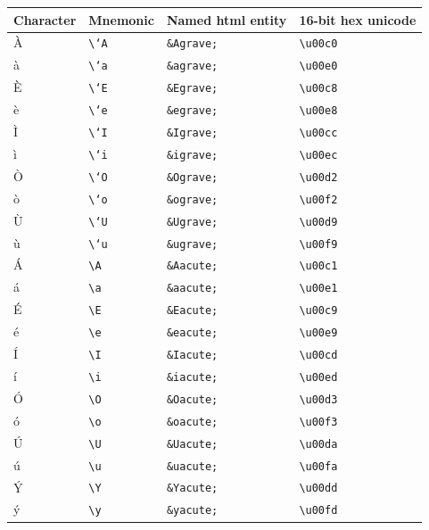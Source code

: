 \documentclass[oneside]{book}
\begin{document}
\begin{longtable}[]{@{}llll@{}}
\toprule
Character & Mnemonic & Named html entity & 16-bit hex
unicode\tabularnewline
\midrule
\endhead
À & \texttt{\textbackslash{}`A} & \texttt{\&Agrave;} &
\texttt{\textbackslash{}u00c0}\tabularnewline
à & \texttt{\textbackslash{}`a} & \texttt{\&agrave;} &
\texttt{\textbackslash{}u00e0}\tabularnewline
È & \texttt{\textbackslash{}`E} & \texttt{\&Egrave;} &
\texttt{\textbackslash{}u00c8}\tabularnewline
è & \texttt{\textbackslash{}`e} & \texttt{\&egrave;} &
\texttt{\textbackslash{}u00e8}\tabularnewline
Ì & \texttt{\textbackslash{}`I} & \texttt{\&Igrave;} &
\texttt{\textbackslash{}u00cc}\tabularnewline
ì & \texttt{\textbackslash{}`i} & \texttt{\&igrave;} &
\texttt{\textbackslash{}u00ec}\tabularnewline
Ò & \texttt{\textbackslash{}`O} & \texttt{\&Ograve;} &
\texttt{\textbackslash{}u00d2}\tabularnewline
ò & \texttt{\textbackslash{}`o} & \texttt{\&ograve;} &
\texttt{\textbackslash{}u00f2}\tabularnewline
Ù & \texttt{\textbackslash{}`U} & \texttt{\&Ugrave;} &
\texttt{\textbackslash{}u00d9}\tabularnewline
ù & \texttt{\textbackslash{}`u} & \texttt{\&ugrave;} &
\texttt{\textbackslash{}u00f9}\tabularnewline
Á & \texttt{\textbackslash{}\textquotesingle{}A} & \texttt{\&Aacute;} &
\texttt{\textbackslash{}u00c1}\tabularnewline
á & \texttt{\textbackslash{}\textquotesingle{}a} & \texttt{\&aacute;} &
\texttt{\textbackslash{}u00e1}\tabularnewline
É & \texttt{\textbackslash{}\textquotesingle{}E} & \texttt{\&Eacute;} &
\texttt{\textbackslash{}u00c9}\tabularnewline
é & \texttt{\textbackslash{}\textquotesingle{}e} & \texttt{\&eacute;} &
\texttt{\textbackslash{}u00e9}\tabularnewline
Í & \texttt{\textbackslash{}\textquotesingle{}I} & \texttt{\&Iacute;} &
\texttt{\textbackslash{}u00cd}\tabularnewline
í & \texttt{\textbackslash{}\textquotesingle{}i} & \texttt{\&iacute;} &
\texttt{\textbackslash{}u00ed}\tabularnewline
Ó & \texttt{\textbackslash{}\textquotesingle{}O} & \texttt{\&Oacute;} &
\texttt{\textbackslash{}u00d3}\tabularnewline
ó & \texttt{\textbackslash{}\textquotesingle{}o} & \texttt{\&oacute;} &
\texttt{\textbackslash{}u00f3}\tabularnewline
Ú & \texttt{\textbackslash{}\textquotesingle{}U} & \texttt{\&Uacute;} &
\texttt{\textbackslash{}u00da}\tabularnewline
ú & \texttt{\textbackslash{}\textquotesingle{}u} & \texttt{\&uacute;} &
\texttt{\textbackslash{}u00fa}\tabularnewline
Ý & \texttt{\textbackslash{}\textquotesingle{}Y} & \texttt{\&Yacute;} &
\texttt{\textbackslash{}u00dd}\tabularnewline
ý & \texttt{\textbackslash{}\textquotesingle{}y} & \texttt{\&yacute;} &
\texttt{\textbackslash{}u00fd}\tabularnewline

\end{longtable}
\end{document}
